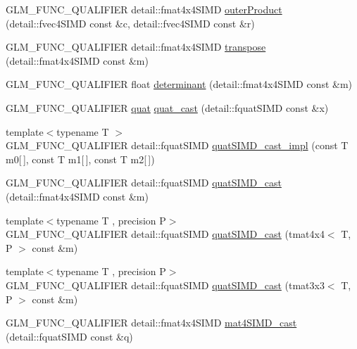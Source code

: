 \begin{DoxyCompactItemize}
G\+L\+M\+\_\+\+F\+U\+N\+C\+\_\+\+Q\+U\+A\+L\+I\+F\+I\+E\+R detail\+::fmat4x4\+S\+I\+M\+D \hyperlink{namespaceglm_a24beb25b08989724431540bb9279937c}{outer\+Product} (detail\+::fvec4\+S\+I\+M\+D const \&c, detail\+::fvec4\+S\+I\+M\+D const \&r)
\item 
G\+L\+M\+\_\+\+F\+U\+N\+C\+\_\+\+Q\+U\+A\+L\+I\+F\+I\+E\+R detail\+::fmat4x4\+S\+I\+M\+D \hyperlink{namespaceglm_a8a85a6f79193f0789bd2ed17802b70f6}{transpose} (detail\+::fmat4x4\+S\+I\+M\+D const \&m)
\item 
G\+L\+M\+\_\+\+F\+U\+N\+C\+\_\+\+Q\+U\+A\+L\+I\+F\+I\+E\+R float \hyperlink{namespaceglm_a3d33b661dfd45c27b41440cd02605c05}{determinant} (detail\+::fmat4x4\+S\+I\+M\+D const \&m)
\item 
G\+L\+M\+\_\+\+F\+U\+N\+C\+\_\+\+Q\+U\+A\+L\+I\+F\+I\+E\+R \hyperlink{namespaceglm_ac1f6a5957091b849730ea6f05a6b7ad6}{quat} \hyperlink{namespaceglm_a68af15a87ea3aac558767c9bb2ed141d}{quat\+\_\+cast} (detail\+::fquat\+S\+I\+M\+D const \&x)
\item 
{\footnotesize template$<$typename T $>$ }\\G\+L\+M\+\_\+\+F\+U\+N\+C\+\_\+\+Q\+U\+A\+L\+I\+F\+I\+E\+R detail\+::fquat\+S\+I\+M\+D \hyperlink{namespaceglm_a2e2bb4244525831b56079cdacc87948d}{quat\+S\+I\+M\+D\+\_\+cast\+\_\+impl} (const T m0\mbox{[}$\,$\mbox{]}, const T m1\mbox{[}$\,$\mbox{]}, const T m2\mbox{[}$\,$\mbox{]})
\item 
G\+L\+M\+\_\+\+F\+U\+N\+C\+\_\+\+Q\+U\+A\+L\+I\+F\+I\+E\+R detail\+::fquat\+S\+I\+M\+D \hyperlink{namespaceglm_a0c09f4c773ffd14c3d9246a50011cf0c}{quat\+S\+I\+M\+D\+\_\+cast} (detail\+::fmat4x4\+S\+I\+M\+D const \&m)
\item 
{\footnotesize template$<$typename T , precision P$>$ }\\G\+L\+M\+\_\+\+F\+U\+N\+C\+\_\+\+Q\+U\+A\+L\+I\+F\+I\+E\+R detail\+::fquat\+S\+I\+M\+D \hyperlink{namespaceglm_a69b23f5cf01145b981cfb276c15813bb}{quat\+S\+I\+M\+D\+\_\+cast} (tmat4x4$<$ T, P $>$ const \&m)
\item 
{\footnotesize template$<$typename T , precision P$>$ }\\G\+L\+M\+\_\+\+F\+U\+N\+C\+\_\+\+Q\+U\+A\+L\+I\+F\+I\+E\+R detail\+::fquat\+S\+I\+M\+D \hyperlink{namespaceglm_a7c78cc8051cf7df0760b2ba061a9f48a}{quat\+S\+I\+M\+D\+\_\+cast} (tmat3x3$<$ T, P $>$ const \&m)
\item 
G\+L\+M\+\_\+\+F\+U\+N\+C\+\_\+\+Q\+U\+A\+L\+I\+F\+I\+E\+R detail\+::fmat4x4\+S\+I\+M\+D \hyperlink{namespaceglm_a0b2e5499072a338c1256735ecbf363ff}{mat4\+S\+I\+M\+D\+\_\+cast} (detail\+::fquat\+S\+I\+M\+D const \&q)

\end{DoxyCompactItemize}
